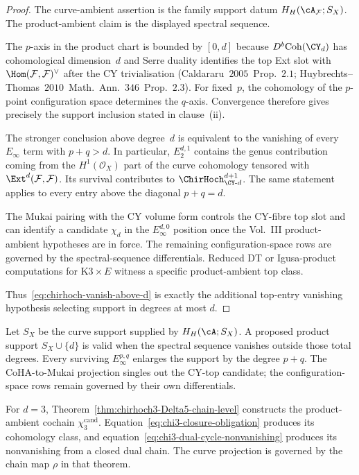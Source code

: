 \begin{proof}
The curve-ambient assertion is the family support datum
$H_H(\cA_\mathcal F;S_X)$.  The product-ambient claim is the displayed
spectral sequence.

The $p$-axis in the product chart is bounded by $[0,d]$ because
$D^b\mathrm{Coh}(\CY_d)$ has cohomological dimension~$d$ and
Serre duality identifies the top Ext slot with
$\Hom(\mathcal F,\mathcal F)^\vee$ after the CY trivialisation
(Caldararu~$2005$~Prop.~$2.1$; Huybrechts--Thomas~$2010$~Math.\
Ann.~$346$~Prop.~$2.3$).  For fixed~$p$, the cohomology of the
$p$-point configuration space determines the $q$-axis.  Convergence
therefore gives precisely the support inclusion stated in
clause~\textup{(ii)}.

The stronger conclusion above degree~$d$ is equivalent to the
vanishing of every $E_\infty$ term with $p+q>d$.  In particular,
$E_2^{d,1}$ contains the genus contribution coming from the
$H^1(\mathcal O_X)$ part of the curve cohomology tensored with
$\Ext^d(\mathcal F,\mathcal F)$.  Its survival contributes to
$\ChirHoch_{\CY\text{-}d}^{d+1}$.  The same statement applies to
every entry above the diagonal $p+q=d$.

The Mukai pairing with the CY volume form controls the CY-fibre top
slot and can identify a candidate $\chi_d$ in the
$E_\infty^{d,0}$ position once the Vol.~III product-ambient
hypotheses are in force.  The remaining configuration-space rows are
governed by the spectral-sequence differentials.  Reduced DT or
Igusa-product computations for $\mathrm{K3}\times E$ witness a
specific product-ambient top class.

Thus~\eqref{eq:chirhoch-vanish-above-d} is exactly the additional
top-entry vanishing hypothesis selecting support in degrees at most
$d$.
\end{proof}

\begin{remark}
\label{rem:theorem-H-concentration-sharp}
Let $S_X$ be the curve support supplied by $H_H(\cA;S_X)$.  A proposed
product support $S_X\cup\{d\}$ is valid when the spectral sequence
vanishes outside those total degrees.  Every surviving
$E_\infty^{p,q}$ enlarges the support by the degree $p+q$.  The
CoHA-to-Mukai projection singles out the CY-top candidate; the
configuration-space rows remain governed by their own differentials.

For \(d=3\), Theorem~\ref{thm:chirhoch3-Delta5-chain-level}
constructs the product-ambient cochain \(\chi_3^{\mathrm{cand}}\).
Equation~\eqref{eq:chi3-closure-obligation} produces its cohomology
class, and equation~\eqref{eq:chi3-dual-cycle-nonvanishing} produces
its nonvanishing from a closed dual chain.  The curve projection is
governed by the chain map \(\rho\) in that theorem.
\end{remark}

